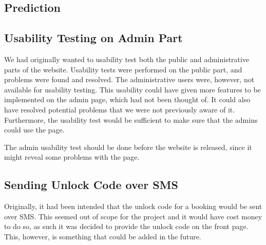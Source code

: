 \subsection{Prediction}\label{subsec:prediction}

\subsection{Usability Testing on Admin Part}
We had originally wanted to usability test both the public and administrative parts of the website.
Usability tests were performed on the public part, and problems were found and resolved. 
The administrative users were, however, not available for usability testing.
This usability could have given more features to be implemented on the admin page, which had not been thought of.
It could also have resolved potential problems that we were not previously aware of it.
Furthermore, the usability test would be sufficient to make sure that the admins could use the page.

The admin usability test should be done before the website is released, since it might reveal some problems with the page.

\subsection{Sending Unlock Code over SMS}
Originally, it had been intended that the unlock code for a booking would be sent over SMS. 
This seemed out of scope for the project and it would have cost money to do so, as such it was decided to provide the unlock code on the front page. 
This, however, is something that could be added in the future.